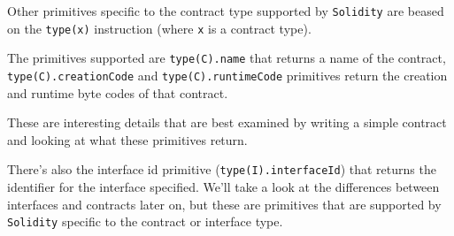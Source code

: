 Other primitives specific to the contract type supported by
\texttt{Solidity} are beased on the \texttt{type(x)} instruction (where
\texttt{x} is a contract type).

The primitives supported are \texttt{type(C).name} that returns a name
of the contract, \texttt{type(C).creationCode} and
\texttt{type(C).runtimeCode} primitives return the creation and runtime
byte codes of that contract.

These are interesting details that are best examined by writing a simple
contract and looking at what these primitives return.

There's also the interface id primitive (\texttt{type(I).interfaceId})
that returns the identifier for the interface specified. We'll take a
look at the differences between interfaces and contracts later on, but
these are primitives that are supported by \texttt{Solidity} specific to
the contract or interface type.
